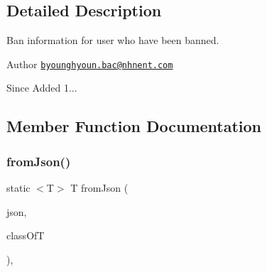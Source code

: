 \subsection{Detailed Description}
Ban information for user who have been banned. 

\begin{DoxyAuthor}{Author}
\href{mailto:byounghyoun.bac@nhnent.com}{\tt byounghyoun.\+bac@nhnent.\+com} 
\end{DoxyAuthor}
\begin{DoxySince}{Since}
Added 1... 
\end{DoxySince}


\subsection{Member Function Documentation}
\mbox{\label{classcom_1_1toast_1_1android_1_1gamebase_1_1base_1_1_value_object_ae6655c88c20a9a8406dc11b46250ac7b}} 
\subsubsection{\texorpdfstring{from\+Json()}{fromJson()}\hspace{0.1cm}{\footnotesize\ttfamily [1/3]}}
{\footnotesize\ttfamily static $<$T$>$ T from\+Json (\begin{DoxyParamCaption}\item[{@Non\+Null String}]{json,  }\item[{Class$<$ T $>$}]{class\+OfT }\end{DoxyParamCaption})\hspace{0.3cm}{\ttfamily [static]}, {\ttfamily [inherited]}}

